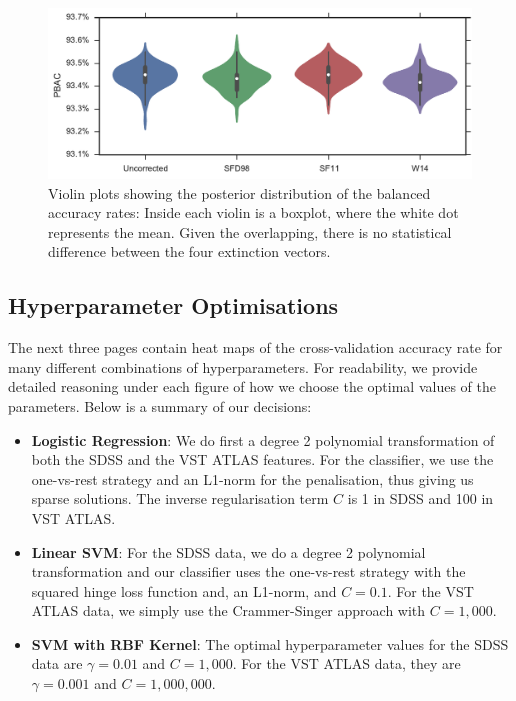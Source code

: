 \begin{figure}[tbp]
	\centering
	\includegraphics[width=\textwidth]{figures/4_expt1/violin_reddening_correction}
	\caption[Accuracy rates with three extinction vectors]{Violin plots
		showing the posterior distribution of the balanced accuracy rates: Inside each
		violin is a boxplot, where the white dot represents the mean. Given the overlapping,
        there is no statistical difference between the four extinction vectors.}
	\label{fig:reddeningviolin}
\end{figure}

\subsection{Hyperparameter Optimisations}
\label{sub:hyper}

The next three pages contain heat maps of the cross-validation accuracy rate
for many different combinations of hyperparameters. For readability, we provide detailed
reasoning under each figure of how we choose the optimal values of the parameters.
Below is a summary of our decisions:
\begin{itemize}
	\item \textbf{Logistic Regression}: We do first a degree 2 polynomial transformation of both
	the SDSS and the VST ATLAS features. For the classifier, we use the one-vs-rest
	strategy and an L1-norm for the penalisation, thus giving us sparse solutions. The inverse
	regularisation term $C$ is 1 in SDSS and 100 in VST ATLAS.
    
	\item \textbf{Linear SVM}: For the SDSS data, we do a degree 2 polynomial transformation
	and our classifier uses the one-vs-rest strategy with the squared hinge loss function
	and, an L1-norm, and $C=0.1$. For the VST ATLAS data, we simply
    use the Crammer-Singer approach with $C = 1,000$.
	\item \textbf{SVM with RBF Kernel}: The optimal hyperparameter values for the SDSS data are
	$\gamma = 0.01$ and $C = 1,000$. For the VST ATLAS data, they are $\gamma = 0.001$ and
	$C = 1,000,000$.
\end{itemize}

